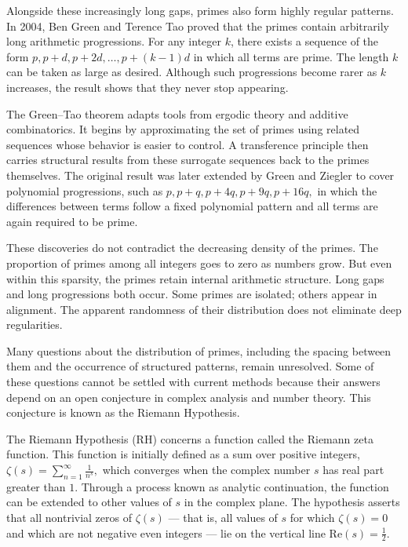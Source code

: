 Alongside these increasingly long gaps, primes also form highly regular patterns. In 2004, Ben Green and Terence Tao proved that the primes contain arbitrarily long arithmetic progressions. For any integer $k$, there exists a sequence of the form $p,  p + d,  p + 2d,  \dots,  p + (k - 1)d$ in which all terms are prime. The length $k$ can be taken as large as desired. Although such progressions become rarer as $k$ increases, the result shows that they never stop appearing.

The Green–Tao theorem adapts tools from ergodic theory and additive combinatorics. It begins by approximating the set of primes using related sequences whose behavior is easier to control. A transference principle then carries structural results from these surrogate sequences back to the primes themselves. The original result was later extended by Green and Ziegler to cover polynomial progressions, such as $p,  p + q,  p + 4q,  p + 9q,  p + 16q, $ in which the differences between terms follow a fixed polynomial pattern and all terms are again required to be prime.

These discoveries do not contradict the decreasing density of the primes. The proportion of primes among all integers goes to zero as numbers grow. But even within this sparsity, the primes retain internal arithmetic structure. Long gaps and long progressions both occur. Some primes are isolated; others appear in alignment. The apparent randomness of their distribution does not eliminate deep regularities.

Many questions about the distribution of primes, including the spacing between them and the occurrence of structured patterns, remain unresolved. Some of these questions cannot be settled with current methods because their answers depend on an open conjecture in complex analysis and number theory. This conjecture is known as the Riemann Hypothesis.

The Riemann Hypothesis (RH) concerns a function called the Riemann zeta function. This function is initially defined as a sum over positive integers, $\zeta(s) = \sum_{n=1}^\infty \frac{1}{n^s},$
which converges when the complex number $s$ has real part greater than $1$. Through a process known as analytic continuation, the function can be extended to other values of $s$ in the complex plane. The hypothesis asserts that all nontrivial zeros of $\zeta(s)$ — that is, all values of $s$ for which $\zeta(s) = 0$ and which are not negative even integers — lie on the vertical line $\mathrm{Re}(s) = \tfrac{1}{2}$.

